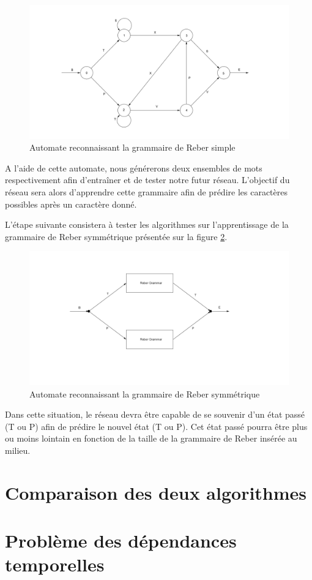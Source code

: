 \begin{figure}[h!]
\begin{center}
\includegraphics[scale=0.3]{images/reber_simple.png}
\caption{Automate reconnaissant la grammaire de Reber simple}
\label{Grammaire de Reber simple}
\end{center}
\end{figure}

A l'aide de cette automate, nous générerons deux ensembles de mots respectivement afin d'entraîner et de tester notre futur réseau. L'objectif du réseau sera alors d'apprendre cette grammaire afin de prédire les caractères possibles après un caractère donné.

L'étape suivante consistera à tester les algorithmes sur l'apprentissage de la grammaire de Reber symmétrique présentée sur la figure \ref{Grammaire de Reber symmétrique}.  
\begin{figure}[h!]
\begin{center}
\includegraphics[scale=0.5]{images/reber_symmetrique.png}
\caption{Automate reconnaissant la grammaire de Reber symmétrique}
\label{Grammaire de Reber symmétrique}
\end{center}
\end{figure}

Dans cette situation, le réseau devra être capable de se souvenir d'un état passé (T ou P) afin de prédire le nouvel état (T ou P). Cet état passé pourra être plus ou moins lointain en fonction de la taille de la grammaire de Reber insérée au milieu. 

\section{Comparaison des deux algorithmes}

\section{Problème des dépendances temporelles}